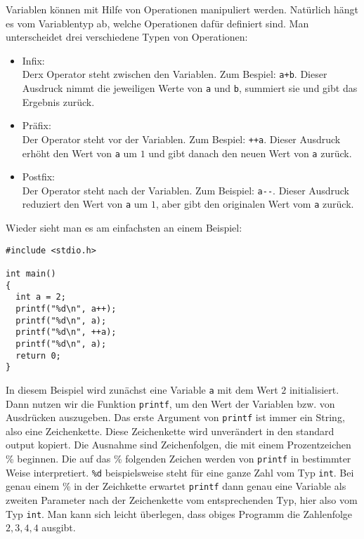 Variablen können mit Hilfe von Operationen manipuliert werden.
Natürlich hängt es vom Variablentyp ab, welche Operationen dafür definiert sind.
Man unterscheidet drei verschiedene Typen von Operationen:
\begin{itemize}
\item Infix:\\
  Derx Operator steht zwischen den Variablen. Zum Bespiel: \verb|a+b|. 
  Dieser Ausdruck nimmt die jeweiligen Werte von \verb|a| und \verb|b|, summiert sie und gibt das Ergebnis zurück.
\item Präfix:\\
  Der Operator steht vor der Variablen. Zum Bespiel: \verb|++a|. 
  Dieser Ausdruck erhöht den Wert von \verb|a| um $1$ und gibt danach den neuen Wert von \verb|a| zurück.
\item Postfix:\\
  Der Operator steht nach der Variablen. Zum Beispiel: \verb|a--|. 
  Dieser Ausdruck reduziert den Wert von \verb|a| um $1$, aber gibt den originalen Wert vom \verb|a| zurück.
\end{itemize}
Wieder sieht man es am einfachsten an einem Beispiel:
\begin{lstlisting}
#include <stdio.h>

int main()
{
  int a = 2;
  printf("%d\n", a++);
  printf("%d\n", a);
  printf("%d\n", ++a);
  printf("%d\n", a);
  return 0;
}
\end{lstlisting}
In diesem Beispiel wird zunächst eine Variable \texttt{a} mit dem Wert $2$ initialisiert. 
Dann nutzen wir die Funktion \texttt{printf}, um den Wert der Variablen bzw. von Ausdrücken auszugeben. 
Das erste Argument von \texttt{printf} ist immer ein String, also eine Zeichenkette.
Diese Zeichenkette wird unverändert in den standard output kopiert.
Die Ausnahme sind Zeichenfolgen, die mit einem Prozentzeichen \% beginnen.
Die auf das \% folgenden Zeichen werden von \texttt{printf} in bestimmter Weise interpretiert.
\verb|%d| beispielsweise steht für eine ganze Zahl vom Typ \texttt{int}. 
Bei genau einem \% in der Zeichkette erwartet \texttt{printf} dann genau eine Variable als zweiten Parameter nach der Zeichenkette vom entsprechenden Typ, hier also vom Typ \texttt{int}.
Man kann sich leicht überlegen, dass obiges Programm die Zahlenfolge $2,3,4,4$ ausgibt.

